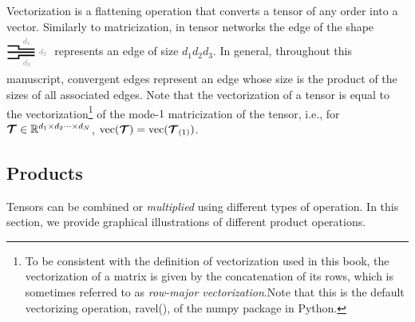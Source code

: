 Vectorization is a flattening operation that converts a tensor of any order into a vector. Similarly to matricization, in tensor networks
the edge of the shape $
\begin{tikzpicture}[baseline=\baseline]
    \tikzset{tensor/.style = {minimum size = 0.5cm,shape = circle,thick,draw=black,inner sep = 0pt}, edge/.style = {thick,line width=.4mm},every loop/.style={}}
    \def\y{0}
    \def\x{0}
    \draw[edge] (\x+0.15,\y+0.2) -- (\x+0.5,\y+0.2) -- (\x+0.5,\y+0.1) -- (\x+1,\y+0.1) node [midway,above]
    {\scalebox{0.7}{\textcolor{gray}{$d_1$}}};
    \draw[edge] (\x+0.15,\y) -- (\x+1,\y)node [right]
    {\scalebox{0.7}{\textcolor{gray}{$d_2$}}};
    \draw[edge] (\x+0.15,\y-0.2) -- (\x+0.5,\y-0.2)-- (\x+0.5,\y-0.1)-- (\x+1,\y-0.1) 
node [midway,below]
    {\scalebox{0.7}{\dimcolor{$d_3$}}};
    \end{tikzpicture}
$ represents an edge of size $d_1d_2d_3$. In general, throughout this manuscript, convergent edges represent an edge whose size is the product of the sizes of all associated edges. Note that the vectorization of a tensor is equal to the vectorization\footnote{To be consistent with the definition of vectorization used in this book, the vectorization of a matrix is given by the concatenation of its rows, which is sometimes referred to as \emph{row-major vectorization}.Note that this is the default vectorizing operation, \textsf{ravel()}, of the \textsf{numpy} package in \textsf{Python}.} of the  mode-$1$ matricization of the tensor, i.e., for $\bm{\mathcal{T}}\in\mathbb{R}^{d_1\times d_2\cdots \times d_N}$, $\mathrm{vec}(\bm{\mathcal{T}}) = \mathrm{vec}(\bm{\mathcal{T}}_{(1)})$.




\subsection{Products}\label{sec:product}
Tensors can be combined or \textit{multiplied} using different types of operation. In this section, we provide graphical illustrations of different product operations.
